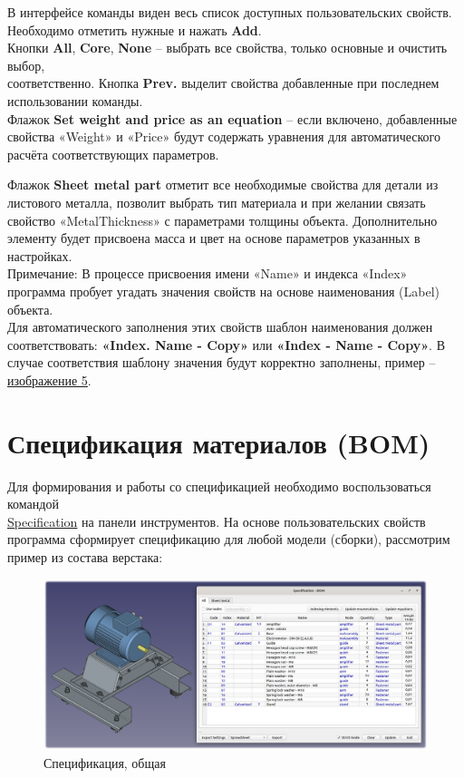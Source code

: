 \documentclass[a4paper,12pt]{article}
\begin{document}
В интерфейсе команды виден весь список доступных пользовательских свойств. Необходимо отметить нужные и нажать \textbf{Add}.\\

Кнопки \textbf{All}, \textbf{Core}, \textbf{None} -- выбрать все свойства, только основные и очистить выбор,\\соответственно. Кнопка \textbf{Prev.} выделит свойства добавленные при последнем использовании команды.\\

Флажок \textbf{Set weight and price as an equation} -- если включено, добавленные свойства «Weight» и «Price» будут содержать уравнения для автоматического расчёта соответствующих параметров.

Флажок \textbf{Sheet metal part} отметит все необходимые свойства для детали из листового металла, позволит выбрать тип материала и при желании связать свойство «MetalThickness» с параметрами толщины объекта. Дополнительно элементу будет присвоена масса и цвет на основе параметров указанных в настройках.\\

Примечание: В процессе присвоения имени «Name» и индекса «Index» программа пробует угадать значения свойств на основе наименования (Label) объекта.\\Для автоматического заполнения этих свойств шаблон наименования должен соответствовать: \textbf{«Index. Name - Copy»} или \textbf{«Index - Name - Copy»}. В случае соответствия шаблону значения будут корректно заполнены, пример -- \hyperref[sec:properties]{изображение 5}.

\pagebreak


\section{Спецификация материалов (BOM)}

Для формирования и работы со спецификацией необходимо воспользоваться командой\\\hyperref[sec:4]{Specification} на панели инструментов. На основе пользовательских свойств программа сформирует спецификацию для любой модели (сборки), рассмотрим пример из состава верстака:

\begin{figure}[htp]
	\centering
	\includegraphics[width=1\textwidth]{img/specification_all.png}
	\caption{Спецификация, общая}
	\label{sec:specification_all}
\end{figure}
\end{document}
